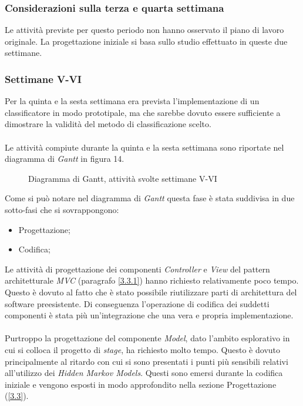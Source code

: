 \subsubsection*{Considerazioni sulla terza e quarta settimana}
Le attività previste per questo periodo non hanno osservato il piano di lavoro originale. La progettazione iniziale si basa sullo studio effettuato in queste due settimane.
\label{3.1.2.1}
\subsubsection{Settimane V-VI}
\label{3.1.3}
Per la quinta e la sesta settimana era prevista l'implementazione di un classificatore in modo prototipale, ma che sarebbe dovuto essere sufficiente a dimostrare la validità del metodo di classificazione scelto.\\\\
Le attività compiute durante la quinta e la sesta settimana sono riportate nel diagramma di \emph{Gantt} in figura 14.
\begin{figure}[H]
\centering
\noindent{}
\caption{Diagramma di Gantt, attività svolte settimane V-VI}
\end{figure}

Come si può notare nel diagramma di \emph{Gantt} questa fase è stata suddivisa in due sotto-fasi che si sovrappongono:
\begin{itemize}
\item Progettazione;
\item Codifica;
\end{itemize}
Le attività di progettazione dei componenti \emph{Controller} e \emph{View} del pattern architetturale \emph{MVC} (paragrafo \ref{3.3.1}) hanno richiesto relativamente poco tempo. Questo è dovuto al fatto che è stato possibile riutilizzare parti di architettura del software preesistente. Di conseguenza l'operazione di codifica dei suddetti componenti è stata più un'integrazione che una vera e propria implementazione.\\\\
Purtroppo la progettazione del componente \emph{Model}, dato l'ambito esplorativo in cui si colloca il progetto di \emph{stage}, ha richiesto molto tempo. Questo è dovuto principalmente al ritardo con cui si sono presentati i punti più sensibili relativi all'utilizzo dei \emph{Hidden Markov Models}. Questi sono emersi durante la codifica iniziale e vengono esposti in modo approfondito nella sezione Progettazione (\ref{3.3}).


